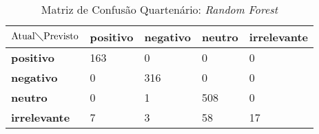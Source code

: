 \begin{table}[h!]
\centering
\caption{Matriz de Confusão Quartenário: \textit{Random Forest}}
\label{tab:mcq-rf}
\begin{tabular}{|l|l|l|l|l|}
\hline
$\textrm{Atual}\diagdown\textrm{Previsto}$ & \textbf{positivo} & \textbf{negativo} & \textbf{neutro} & \textbf{irrelevante}\\ \hline
\textbf{positivo} & 163 & 0 & 0 & 0\\ \hline
\textbf{negativo} & 0 & 316 & 0 & 0\\ \hline
\textbf{neutro} & 0 & 1 & 508 & 0 \\ \hline
\textbf{irrelevante} & 7 & 3 & 58 & 17 \\ \hline
\end{tabular}
\end{table}